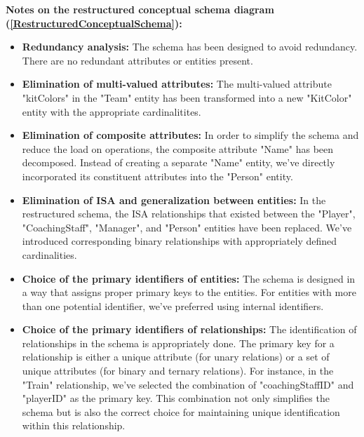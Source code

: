 \textbf{Notes on the restructured conceptual schema diagram (\ref{RestructuredConceptualSchema}):\\}
\begin{itemize}
  \item \textbf{Redundancy analysis:}
  \newline The schema has been designed to avoid redundancy. There are no redundant attributes or entities present.
  \item \textbf{Elimination of multi-valued attributes:}
 \newline The multi-valued attribute "kitColors" in the "Team" entity has been transformed into a new "KitColor" entity with the appropriate cardinalitites.
  \item \textbf{Elimination of composite attributes:}
  \newline In order to simplify the schema and reduce the load on operations, the composite attribute "Name" has been decomposed. Instead of creating a separate "Name" entity, we've directly incorporated its constituent attributes into the "Person" entity.
  \item \textbf{Elimination of ISA and generalization between entities:}
  \newline In the restructured schema, the ISA relationships that existed between the "Player", \newline "CoachingStaff", "Manager", and "Person" entities have been replaced. We've introduced corresponding binary relationships with appropriately defined cardinalities.
  \item \textbf{Choice of the primary identifiers of entities:}
  \newline The schema is designed in a way that assigns proper primary keys to the entities. For entities with more than one potential identifier, we've preferred using internal identifiers.
  \item \textbf{Choice of the primary identifiers of relationships:}
  \newline The identification of relationships in the schema is appropriately done. The primary key for a relationship is either a unique attribute (for unary relations) or a set of unique attributes (for binary and ternary relations). For instance, in the "Train" relationship, we've selected the combination of "coachingStaffID" and "playerID" as the primary key. This combination not only simplifies the schema but is also the correct choice for maintaining unique identification within this relationship.
\end{itemize}

